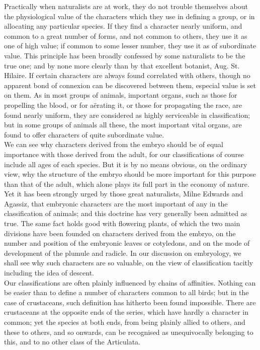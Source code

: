 \indent Practically when naturalists are at work, they do not trouble themselves about the physiological value of the characters which they use in defining a group, or in allocating any particular species. If they find a character nearly uniform, and common to a great number of forms, and not common to others, they use it as one of high value; if common to some lesser number, they use it as of subordinate value. This principle has been broadly confessed by some naturalists to be the true one; and by none more clearly than by that excellent botanist, Aug. St. Hilaire. If certain characters are always found correlated with others, though no apparent bond of connexion can be discovered between them, especial value is set on them. As in most groups of animals, important organs, such as those for propelling the blood, or for a\"{e}rating it, or those for propagating the race, are found nearly uniform, they are considered as highly serviceable in classification; but in some groups of animals all these, the most important vital organs, are found to offer characters of quite subordinate value.~\\
\indent We can see why characters derived from the embryo should be of equal importance with those derived from the adult, for our classifications of course include all ages of each species. But it is by no means obvious, on the ordinary view, why the structure of the embryo should be more important for this purpose than that of the adult, which alone plays its full part in the economy of nature. Yet it has been strongly urged by those great naturalists, Milne Edwards and Agassiz, that embryonic characters are the most important of any in the classification of animals; and this doctrine has very generally been admitted as true. The same fact holds good with flowering plants, of which the two main divisions have been founded on characters derived from the embryo, on the number and position of the embryonic leaves or cotyledons, and on the mode of development of the plumule and radicle. In our discussion on embryology, we shall see why such characters are so valuable, on the view of classification tacitly including the idea of descent.~\\
\indent Our classifications are often plainly influenced by chains of affinities. Nothing can be easier than to define a number of characters common to all birds; but in the case of crustaceans, such definition has hitherto been found impossible. There are crustaceans at the opposite ends of the series, which have hardly a character in common; yet the species at both ends, from being plainly allied to others, and these to others, and so onwards, can be recognised as unequivocally belonging to this, and to no other class of the Articulata.~\\
